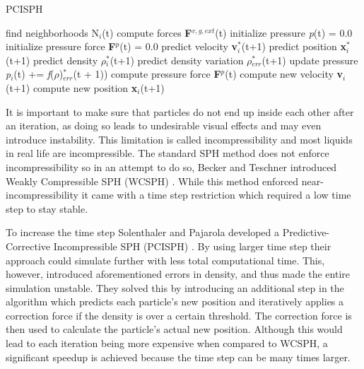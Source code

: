 \documentclass[../../main.tex]{subfiles}
\begin{document}
\begin{algorithm}[h]
   \caption{PCISPH}
    \label{alg:pcisph}
    \begin{algorithmic}[1]
            \State find neighborhoods N$_i$(t)
        \EndFor
            \State compute forces \textbf{F}$^{v, g, ext}$(t)
            \State initialize pressure \textit{p}(t) = 0.0
            \State initialize pressure force \textbf{F}$^p$(t) = 0.0
        \EndFor
                \State predict velocity \textbf{v}$^*_i$(t+1)
                \State predict position \textbf{x}$^*_i$(t+1)
            \EndFor
                \State predict density \textbf{$\rho$}$^*_i$(t+1)
                \State predict density variation \textbf{$\rho$}$^*_{err}$(t+1)
                \State update pressure \textit{p}$_i$(t) += \textit{f}($\rho$)$^*_{err}$(t + 1))
            \EndFor
                \State compute pressure force \textbf{F}$^p$(t)
            \EndFor
        \EndWhile
            \State compute new velocity \textbf{v}$_i$(t+1)
            \State compute new position \textbf{x}$_i$(t+1)
        \EndFor
    \EndWhile
   \end{algorithmic}
\end{algorithm}

It is important to make sure that particles do not end up inside each other after an iteration, as doing so leads to undesirable visual effects and may even introduce instability. This limitation is called incompressibility and most liquids in real life are incompressible. The standard SPH method \citep{lucy1977numerical} does not enforce incompressibility so in an attempt to do so, Becker and Teschner introduced Weakly Compressible SPH (WCSPH) \citep{becker2007weakly}. While this method enforced near-incompressibility it came with a time step restriction which required a low time step to stay stable.

To increase the time step Solenthaler and Pajarola developed a Predictive-Corrective Incompressible SPH (PCISPH) \citep{solenthaler2009predictive}. By using larger time step their approach could simulate further with less total computational time. This, however, introduced aforementioned errors in density, and thus made the entire simulation unstable. They solved this by introducing an additional step in the algorithm which predicts each particle's new position and iteratively applies a correction force if the density is over a certain threshold. The correction force is then used to calculate the particle's actual new position. Although this would lead to each iteration being more expensive when compared to WCSPH, a significant speedup is achieved because the time step can be many times larger.
\end{document}
